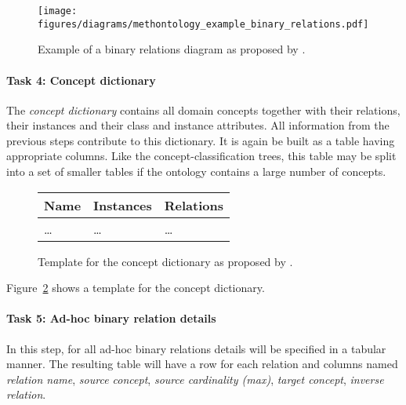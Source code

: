 \begin{figure}
\centering
\texttt{[image: figures/diagrams/methontology\_example\_binary\_relations.pdf]}
\caption{Example of a binary relations diagram as proposed by \methontology.}
\label{fig:methontology_example_binary_relations}
\end{figure}


\paragraph{Task 4: Concept dictionary}

The \emph{concept dictionary} contains all domain concepts together with their relations, their instances and their class and instance attributes. All information from the previous steps contribute to this dictionary. It is again be built as a table having appropriate columns. Like the concept-classification trees, this table may be split into a set of smaller tables if the ontology contains a large number of concepts.

\begin{figure}
\centering
\begin{tabular}{|p{}|p{}|p{}|}
  \hline
  \textbf{Name} & \textbf{Instances} & \textbf{Relations} \\
  \hline\hline
  … & … & … \\
  \hline
\end{tabular}
\caption{Template for the concept dictionary as proposed by \methontology.}
\label{fig:methontology_example_concept_dictionary}
\end{figure}

Figure~\ref{fig:methontology_example_concept_dictionary} shows a template for the concept dictionary.


\paragraph{Task 5: Ad-hoc binary relation details}

In this step, for all ad-hoc binary relations details will be specified in a tabular manner. The resulting table will have a row for each relation and columns named \emph{relation name}, \emph{source concept}, \emph{source cardinality (max)}, \emph{target concept}, \emph{inverse relation}.


